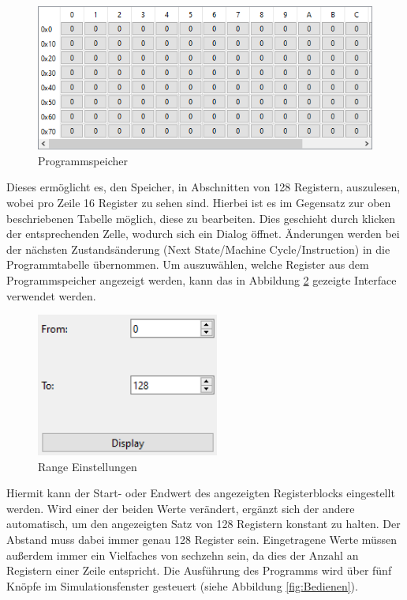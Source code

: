 \documentclass[12pt]{article}
\newcommand{\imgSpaceBefore}{\vspace{10pt}}
\begin{document}
\begin{figure}[H]
\centering
\includegraphics[width=12cm]{bilder/ProgramMemory}
\caption{Programmspeicher}
\label{fig:ProgSpeicher}
\end{figure}

\noindent
Dieses ermöglicht es, den Speicher, in Abschnitten von 128 Registern, auszulesen, wobei pro Zeile 16 Register zu sehen sind. Hierbei ist es im Gegensatz zur oben beschriebenen Tabelle möglich, diese zu bearbeiten. Dies geschieht durch klicken der entsprechenden Zelle, wodurch sich ein Dialog öffnet. Änderungen werden bei der nächsten Zustandsänderung (\glqq Next State/Machine Cycle/Instruction\grqq) in die Programmtabelle übernommen. Um auszuwählen, welche Register aus dem Programmspeicher angezeigt werden, kann das in Abbildung \ref{fig:Range} gezeigte Interface verwendet werden.\imgSpaceBefore

\begin{figure}[h]
\centering
\includegraphics[width=6cm]{bilder/Range}
\caption{Range Einstellungen}
\label{fig:Range}
\end{figure}

\noindent
Hiermit kann der Start- oder Endwert des angezeigten Registerblocks eingestellt werden. Wird einer der beiden Werte verändert, ergänzt sich der andere automatisch, um den angezeigten Satz von 128 Registern konstant zu halten. Der Abstand muss dabei immer genau 128 Register sein. Eingetragene Werte müssen außerdem immer ein Vielfaches von sechzehn sein, da dies der Anzahl an Registern einer Zeile entspricht. Die Ausführung des Programms wird über fünf Knöpfe im Simulationsfenster gesteuert (siehe Abbildung \ref{fig:Bedienen}).\imgSpaceBefore
\end{document}
